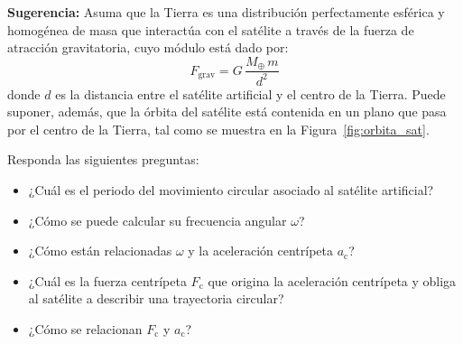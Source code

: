 \documentclass[addpoints]{exam}
\begin{document}
\begin{questions}
    \textbf{Sugerencia:} Asuma que la Tierra es una distribución perfectamente esférica y homogénea de masa que interactúa con el satélite a través de la fuerza de atracción gravitatoria, cuyo módulo está dado por: $$F_\text{grav} = G \, \frac{M_\oplus \, m}{d^2}$$ donde $d$ es la distancia entre el satélite artificial y el centro de la Tierra. Puede suponer, además, que la órbita del satélite está contenida en un plano que pasa por el centro de la Tierra, tal como se muestra en la Figura~\ref{fig:orbita_sat}.

    Responda las siguientes preguntas:
    \begin{itemize}
        \item ¿Cuál es el periodo del movimiento circular asociado al satélite artificial?
        \item ¿Cómo se puede calcular su frecuencia angular $\omega$?
        \item ¿Cómo están relacionadas $\omega$ y la aceleración centrípeta $a_\text{c}$?
        \item ¿Cuál es la fuerza centrípeta $F_\text{c}$ que origina la aceleración centrípeta y obliga al satélite a describir una trayectoria circular?
        \item ¿Cómo se relacionan $F_\text{c}$ y $a_\text{c}$?
    \end{itemize}


\end{questions}
\end{document}
